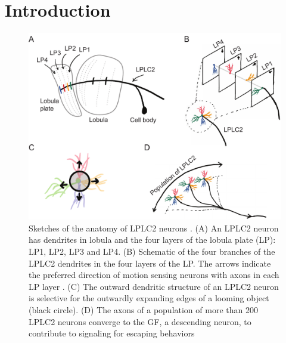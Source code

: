 \documentclass[pdftex,9pt,lineno]{elife}
\begin{document}
\section{Introduction}

\begin{figure}
\includegraphics[width=\linewidth]{figures/anatomy_paper.pdf}
\caption{Sketches of the anatomy of LPLC2 neurons \citep{klapoetke2017ultra}. (A) An LPLC2 neuron has dendrites in lobula and the four layers of the lobula plate (LP): LP1, LP2, LP3 and LP4. (B) Schematic of the four branches of the LPLC2 dendrites in the four layers of the LP. The arrows indicate the preferred direction of motion sensing neurons with axons in each LP layer \citep{maisak2013directional}. (C) The outward dendritic structure of an LPLC2 neuron is selective for the outwardly expanding edges of a looming object (black circle). (D) The axons of a population of more than 200 LPLC2 neurons converge to the GF, a descending neuron, to contribute to signaling for escaping behaviors \citep{ache2019neural}}
\label{fig:anatomy}
\end{figure}
\end{document}
